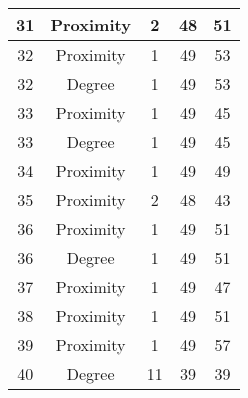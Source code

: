 \documentclass[results.tex]{subfiles}
\begin{document}
\begin{center}
\begin{tabular}{| c || c | c | c | c |}
            \hline
            31                      & Proximity                    & 2                      & 48                      & 51                   \\
            \hline
            32                      & Proximity                    & 1                      & 49                      & 53                   \\
            \hline
            32                      & Degree                       & 1                      & 49                      & 53                   \\
            \hline
            33                      & Proximity                    & 1                      & 49                      & 45                   \\
            \hline
            33                      & Degree                       & 1                      & 49                      & 45                   \\
            \hline
            34                      & Proximity                    & 1                      & 49                      & 49                   \\
            \hline
            35                      & Proximity                    & 2                      & 48                      & 43                   \\
            \hline
            36                      & Proximity                    & 1                      & 49                      & 51                   \\
            \hline
            36                      & Degree                       & 1                      & 49                      & 51                   \\
            \hline
            37                      & Proximity                    & 1                      & 49                      & 47                   \\
            \hline
            38                      & Proximity                    & 1                      & 49                      & 51                   \\
            \hline
            39                      & Proximity                    & 1                      & 49                      & 57                   \\
            \hline
            40                      & Degree                       & 11                     & 39                      & 39                   \\

\end{tabular}
\end{center}
\end{document}

